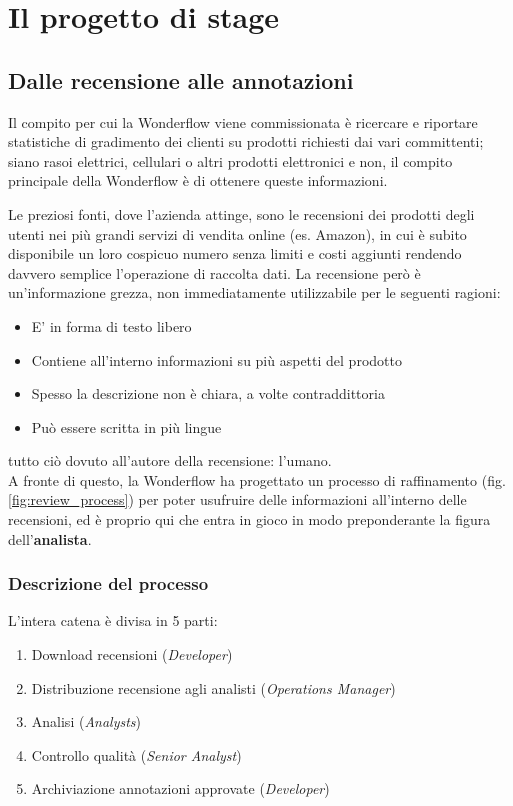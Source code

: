 
\chapter{Il progetto di stage}
\label{cap:progetto-stage}

\section{Dalle recensione alle annotazioni}
Il compito per cui la Wonderflow viene commissionata è ricercare e riportare
statistiche di gradimento dei clienti su prodotti richiesti dai vari
committenti; siano rasoi elettrici, cellulari o altri prodotti elettronici e
non, il compito principale della Wonderflow è di ottenere queste informazioni.

Le preziosi fonti, dove l'azienda attinge, sono le recensioni dei prodotti
degli utenti nei più grandi servizi di vendita online (es. Amazon), in cui è
subito disponibile un loro cospicuo numero senza limiti e costi aggiunti
rendendo davvero semplice l'operazione di raccolta dati. La recensione
però è un'informazione grezza, non immediatamente utilizzabile per le seguenti
ragioni:
\begin{itemize}
\item E' in forma di testo libero
\item Contiene all'interno informazioni su più aspetti del prodotto
\item Spesso la descrizione non è chiara, a volte contraddittoria
\item Può essere scritta in più lingue
\end{itemize}

tutto ciò dovuto all'autore della recensione: l'umano. \\

A fronte di questo, la Wonderflow ha progettato un processo di raffinamento
(fig. \ref{fig:review_process}) per poter usufruire delle informazioni
all'interno delle recensioni, ed è proprio qui che entra in gioco in modo
preponderante la figura dell'\textbf{analista}.

\subsection{Descrizione del processo}
\label{subsec:processo_recensioni_annotazioni}
L'intera catena è divisa in 5 parti:
\begin{enumerate}
  \item Download recensioni (\textit{Developer})
  \item Distribuzione recensione agli analisti (\textit{Operations Manager})
  \item Analisi (\textit{Analysts})
  \item Controllo qualità (\textit{Senior Analyst})
  \item Archiviazione annotazioni approvate (\textit{Developer})
\end{enumerate}

